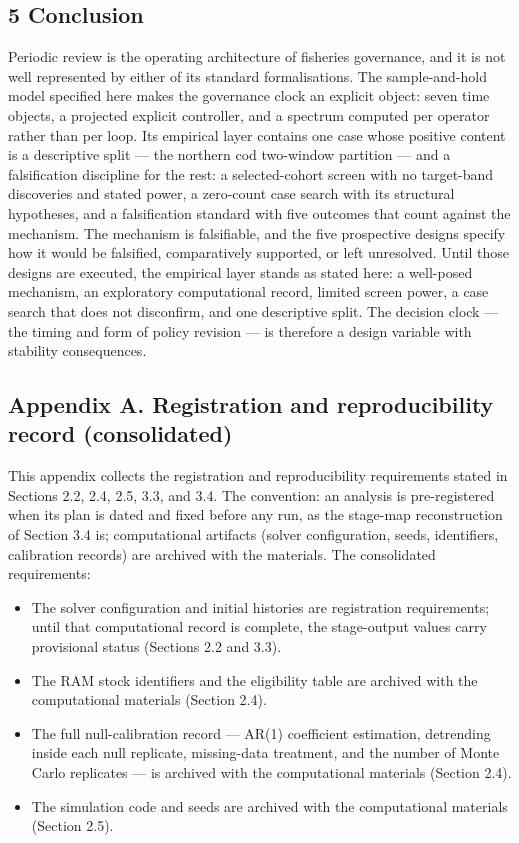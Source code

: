 \documentclass[11pt]{article}
\providecommand{\tightlist}{\setlength{\itemsep}{0pt}\setlength{\parskip}{0pt}}
\begin{document}
\subsection{5 Conclusion}\label{conclusion}

Periodic review is the operating architecture of fisheries governance,
and it is not well represented by either of its standard formalisations.
The sample-and-hold model specified here makes the governance clock an
explicit object: seven time objects, a projected explicit controller,
and a spectrum computed per operator rather than per loop. Its empirical
layer contains one case whose
positive content is a descriptive split --- the northern cod two-window
partition --- and a falsification discipline for the rest: a selected-cohort
screen with no target-band discoveries and stated power, a zero-count
case search with its structural hypotheses, and a falsification standard
with five outcomes that count against the mechanism. The mechanism is
falsifiable, and the five prospective designs specify how it would be
falsified, comparatively supported, or left unresolved. Until those
designs are executed, the empirical layer stands as stated here: a
well-posed mechanism, an exploratory computational record, limited
screen power, a case search that does not disconfirm, and one descriptive split. The decision clock --- the timing and form of policy revision --- is therefore a design variable with stability consequences.

\subsection{Appendix A. Registration and reproducibility record
(consolidated)}\label{appendix-a.-registration-and-reproducibility-record-consolidated}

This appendix collects the registration and reproducibility requirements stated in Sections 2.2, 2.4, 2.5, 3.3, and 3.4. The convention: an analysis is pre-registered when its plan is dated and fixed before any run, as the stage-map reconstruction of Section 3.4 is; computational artifacts (solver configuration, seeds, identifiers, calibration records) are archived with the materials. The consolidated requirements:

\begin{itemize}
\tightlist
\item
  The solver configuration and initial histories are
  registration requirements; until that computational record is complete,
  the stage-output values carry provisional status (Sections 2.2 and
  3.3).
\item
  The RAM stock identifiers and the eligibility table are
  archived with the computational materials (Section 2.4).
\item
  The full null-calibration record --- AR(1) coefficient estimation,
  detrending inside each null replicate, missing-data treatment, and the
  number of Monte Carlo replicates --- is archived with the computational materials (Section 2.4).
\item
  The simulation code and seeds are archived with the computational materials
  (Section 2.5).
\end{itemize}
\end{document}
